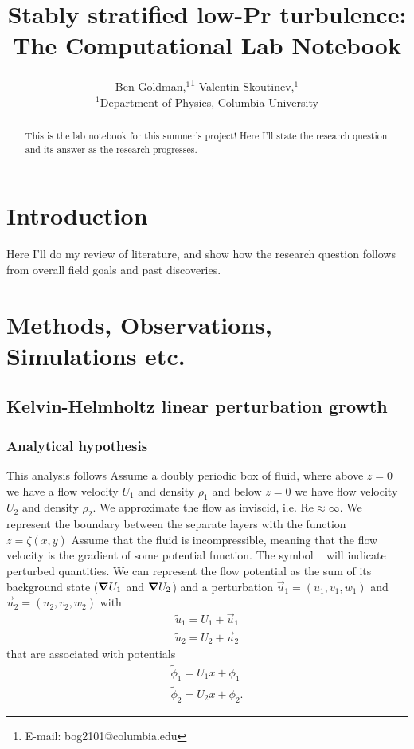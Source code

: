 \documentclass[10pt]{article}
\title{Stably stratified low-Pr turbulence:\\ The Computational Lab Notebook}
\author{
    Ben Goldman,$^{1}$\thanks{E-mail: bog2101@columbia.edu}
    Valentin Skoutinev,$^{1}$
    \\
    $^{1}$Department of Physics, Columbia University
}
\renewcommand{\Re}{\mathrm{Re}}
\begin{document}
\label{firstpage}
\maketitle

\begin{abstract}
    This is the lab notebook for this summer's project! Here I'll state the research question and its answer as the research progresses.
\end{abstract}

\section{Introduction}

Here I'll do my review of literature, and show how the research question follows from overall field goals and past discoveries.

\section{Methods, Observations, Simulations etc.}

\subsection{Kelvin-Helmholtz linear perturbation growth}

\subsubsection{Analytical hypothesis}
This analysis follows \citet{kundu2004}
Assume a doubly periodic box of fluid, where above $z=0$ we have a flow velocity $U_1$ and density $\rho_1$ and below $z=0$ we have flow velocity $U_2$ and density $\rho_2$. We approximate the flow as inviscid, i.e. $\Re \approx \infty$. We represent the boundary between the separate layers with the function $z = \zeta(x, y)$ Assume that the fluid is incompressible, meaning that the flow velocity is the gradient of some potential function. The symbol ~ will indicate perturbed quantities. We can represent the flow potential as the sum of its background state ($\grad U_1$ and $\grad U_2$) and a perturbation $\vec{u}_1 = (u_1, v_1, w_1)$ and $\vec{u}_2 = (u_2, v_2, w_2)$ with
\begin{align}
    \tilde{u}_1 = U_1 + \vec{u}_1 \\
    \tilde{u}_2 = U_2 + \vec{u}_2
\end{align}
that are associated with potentials
\begin{align}
    \tilde{\phi}_1 = U_1x + \phi_1 \\
    \tilde{\phi}_2 = U_2x + \phi_2.
\end{align}
\end{document}
